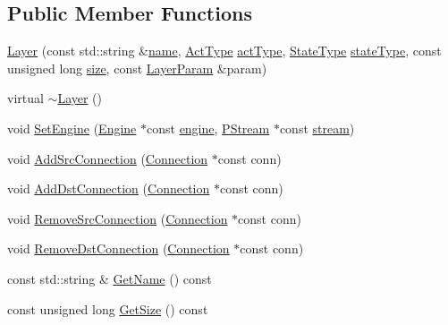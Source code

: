 \subsection*{Public Member Functions}
\begin{DoxyCompactItemize}
\item 
\hyperlink{classfractal_1_1Layer_a5b609c2c63c95ace0b4bc7d787def055}{Layer} (const std\+::string \&\hyperlink{classfractal_1_1Layer_a657c8772dd166aca9aafc082850c1c78}{name}, \hyperlink{namespacefractal_a6b4f3887f3de57d4b1cbb00d198833ec}{Act\+Type} \hyperlink{classfractal_1_1Layer_a042deda27b82d3ff498bb5f9c4bbf115}{act\+Type}, \hyperlink{namespacefractal_a17646dafc0f3fc262f238822cca09f2e}{State\+Type} \hyperlink{classfractal_1_1Layer_a4f837fc5c1e649317ef534083ea24dfe}{state\+Type}, const unsigned long \hyperlink{classfractal_1_1Layer_ad772ed1139baedba2bb70b7f235f32d5}{size}, const \hyperlink{classfractal_1_1LayerParam}{Layer\+Param} \&param)
\item 
virtual \hyperlink{classfractal_1_1Layer_ab3e3a921b0b98b1a8b9dc749bc55239f}{$\sim$\+Layer} ()
\item 
void \hyperlink{classfractal_1_1Layer_ae407d121b9ce2586d782bb7a61a7ed81}{Set\+Engine} (\hyperlink{classfractal_1_1Engine}{Engine} $\ast$const \hyperlink{classfractal_1_1Layer_a95f0129c9d79e1292d7d1e5732d70e5e}{engine}, \hyperlink{classfractal_1_1PStream}{P\+Stream} $\ast$const \hyperlink{classfractal_1_1Layer_aef36108269bffa0d3ecbd67f190362fa}{stream})
\item 
void \hyperlink{classfractal_1_1Layer_aec6987d45b69d42f21f58c28443d9b1f}{Add\+Src\+Connection} (\hyperlink{classfractal_1_1Connection}{Connection} $\ast$const conn)
\item 
void \hyperlink{classfractal_1_1Layer_ac5eb5c22c720d95cf37d05a2e73a85e4}{Add\+Dst\+Connection} (\hyperlink{classfractal_1_1Connection}{Connection} $\ast$const conn)
\item 
void \hyperlink{classfractal_1_1Layer_a2d2919469482d824750ef4b901181a35}{Remove\+Src\+Connection} (\hyperlink{classfractal_1_1Connection}{Connection} $\ast$const conn)
\item 
void \hyperlink{classfractal_1_1Layer_afbdad6fd27ae9498f4b2070099b84619}{Remove\+Dst\+Connection} (\hyperlink{classfractal_1_1Connection}{Connection} $\ast$const conn)
\item 
const std\+::string \& \hyperlink{classfractal_1_1Layer_a2759b1e5c36b3e0c9bc904f8648f5ca1}{Get\+Name} () const 
\item 
const unsigned long \hyperlink{classfractal_1_1Layer_a5d7c10187a49ccdadedc12e4c930c090}{Get\+Size} () const 

\end{DoxyCompactItemize}
